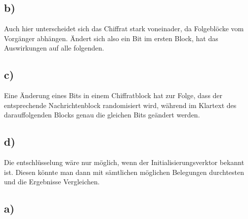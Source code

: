 \documentclass[ngerman]{fbi-aufgabenblatt}
\begin{document}
	\subsection*{b)}
	Auch hier unterscheidet sich das Chiffrat stark voneinader, da Folgeblöcke vom Vorgänger abhängen. Ändert sich also ein Bit im ersten Block, hat das Auswirkungen auf alle folgenden.
	
	\subsection*{c)}
	Eine Änderung eines Bits in einem Chiffratblock hat zur Folge, dass der entsprechende Nachrichtenblock randomisiert wird, während im Klartext des darauffolgenden Blocks genau die gleichen Bits geändert werden.

	\subsection*{d)}
	Die entschlüsselung wäre nur möglich, wenn der Initialisierungsverktor bekannt ist. Diesen könnte man dann mit sämtlichen möglichen Belegungen durchtesten und die Ergebnisse Vergleichen.
	
	
	
	
	\subsection*{a)}
	
\end{document}
